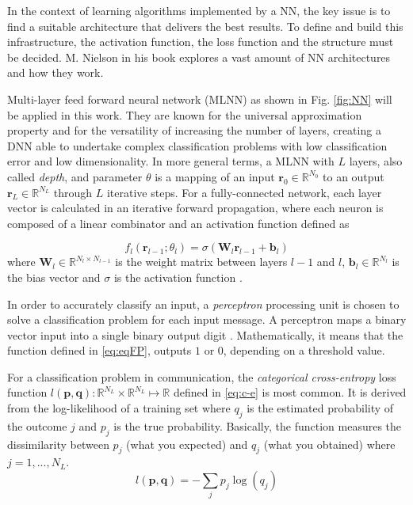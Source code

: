\documentclass[conference]{IEEEtran}
\begin{document}
In the context of learning algorithms implemented by a NN, the key issue is to find a suitable architecture that delivers the best results. To define and build this infrastructure, the activation function, the loss function and the structure must be decided.  M. Nielson \cite{b8} in his book explores a vast amount of NN architectures and how they work. 

Multi-layer feed forward neural network (MLNN) as shown in Fig. \ref{fig:NN} will be applied in this work. They are known for the universal approximation property \cite{b9} and for the versatility of increasing the number of layers, creating a DNN able to undertake complex classification problems with low classification error and low dimensionality. In more general terms, a MLNN with $L$ layers, also called \textit{depth}, and parameter $\theta$ is a mapping of an input $\textbf{r}_0 \in \mathbb{R}^{N_0}$ to an output $\textbf{r}_L \in \mathbb{R}^{N_L}$ through $L$ iterative steps. For a fully-connected network, each layer vector is calculated in an iterative forward propagation, where each neuron is composed of a linear combinator and an activation function defined as 

\begin{equation}\label{eq:eqFP}
	f_{l}\left( \textbf{r}_{l-1};\theta _{l}\right) = \sigma \left( \textbf{W}_{l}\textbf{r}_{l-1}+\textbf{b}_{l}\right)
\end{equation}
where $\textbf{W}_{l}\in \mathbb{R} ^{N_{l}\times N_{l-1}}$ is the weight matrix between layers $l-1$ and $l$,  $\textbf{b}_{l}\in \mathbb{R} ^{N_l}$ is the bias vector and $\sigma$ is the activation function \cite{b2}.

In order to accurately classify an input, a \textit{perceptron} processing unit is chosen to solve a classification problem for each input message. A perceptron maps a binary vector input into a single binary output digit \cite{b8}. Mathematically, it means that the function defined in \eqref{eq:eqFP}, outputs $1$ or $0$, depending on a threshold value.

For a classification problem in communication, the \textit{categorical cross-entropy} loss function $l(\textbf{p},\textbf{q}):\mathbb{R} ^{N_L}\times \mathbb{R} ^{N_L}\mapsto \mathbb{R}$ defined in \eqref{eq:c-e} is most common. It is derived from the log-likelihood of a training set where $q_j$ is the estimated probability of the outcome $j$ and $p_{j}$ is the true probability. Basically, the function measures the dissimilarity between $p_{j}$ (what you expected) and $q_{j}$ (what you obtained) \cite{b10} where $j=1,...,N_L$.
\begin{equation}\label{eq:c-e}
	l(\textbf{p},\textbf{q})=-\sum _{j}p_{j}\log \left( q_{j}\right)
\end{equation}
\end{document}
